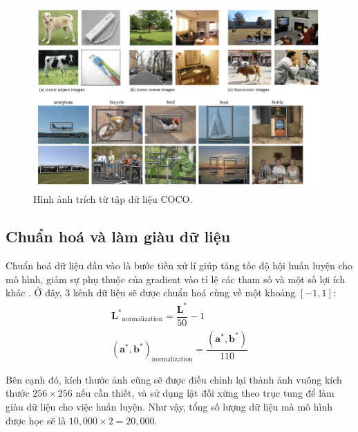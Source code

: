 \documentclass[a4paper, 12pt]{article}
\begin{document}
\begin{figure}[!h]
\captionsetup{width=0.8\textwidth}
\centering
\includegraphics[width=15cm]{images/3_1.png}
\caption{Hình ảnh trích từ tập dữ liệu COCO.}
\end{figure}

\subsection{Chuẩn hoá và làm giàu dữ liệu}\label{normalization}

Chuẩn hoá dữ liệu đầu vào là bước tiền xử lí giúp tăng tốc độ hội huấn luyện cho mô hình, giảm sự phụ thuộc của gradient vào tỉ lệ các tham số và một số lợi ích khác \cite{jasonscaledata2019, benscaledata2012}. Ở đây, 3 kênh dữ liệu sẽ được chuẩn hoá cùng về một khoảng $[-1, 1]$:
\begin{align*}
    \mathbf{L^*}_{\text{normalization}} = \dfrac{\mathbf{L^*}}{50} - 1\\
    \mathbf{(a^*, b^*)}_{\text{normalization}} = \dfrac{\mathbf{(a^*, b^*)}}{110}
\end{align*}

\noindent
Bên cạnh đó, kích thước ảnh cũng sẽ được điều chỉnh lại thành ảnh vuông kích thước $256\times 256$ nếu cần thiết, và sử dụng lật đối xứng theo trục tung để làm giàu dữ liệu cho việc huấn luyện. Như vậy, tổng số lượng dữ liệu mà mô hình được học sẽ là $10,000 \times 2 = 20,000$.
\end{document}
